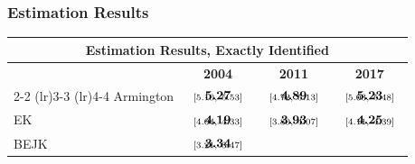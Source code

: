 \documentclass[10pt,pdftex,aspectratio=1610]{beamer}
\theoremstyle{definition}
\begin{document}
\begin{frame}[t]
\frametitle{Estimation Results}
\footnotesize

\begin{table}[!t]
\footnotesize
\renewcommand{\arraystretch}{1.85}
\setlength {\tabcolsep}{3.0mm}
\begin{center}\label{tb:data_rslts}
\begin{tabular}[t]{l c c c }
\multicolumn{4}{c}{\normalsize \textbf{ Estimation Results, Exactly Identified}}
\\
\hline
\hline
& \textbf{2004} & \textbf{2011} & \textbf{2017} \\
\cmidrule(r){2-2}  \cmidrule(lr){3-3} \cmidrule(lr){4-4}
Armington       & $\begin{array}{c}{\textbf{5.27}} \vspace{-.4cm}\\ \scriptstyle{[5.10,   \ 5.53]}\end{array}$ &
$\begin{array}{c}{\textbf{4.89}} \vspace{-.4cm}\\ \scriptstyle{[4.72,   \ 5.13]}\end{array}$ &
$\begin{array}{c}{\textbf{5.23}} \vspace{-.4cm}\\ \scriptstyle{[5.03,   \ 5.48]}\end{array}$ \\
EK              & $\begin{array}{c}{\textbf{4.19}} \vspace{-.4cm}\\ \scriptstyle{[4.04,   \ 4.33]}\end{array}$  &
$\begin{array}{c}{\textbf{3.93}} \vspace{-.4cm}\\ \scriptstyle{[3.80,   \ 4.07]}\end{array}$ &
$\begin{array}{c}{\textbf{4.25}} \vspace{-.4cm}\\ \scriptstyle{[4.11,   \ 4.39]}\end{array}$\\
BEJK            & $\begin{array}{c}{\textbf{3.34}} \vspace{-.4cm}\\ \scriptstyle{[3.21,   \ 3.47]}\end{array}$ &

\end{tabular}
\end{center}
\end{table}
\end{frame}
\end{document}
